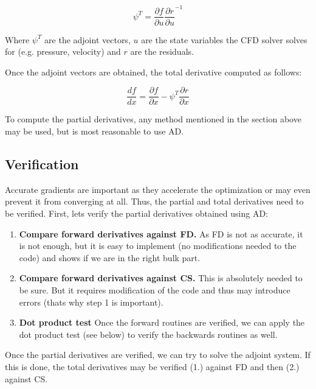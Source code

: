 \begin{equation}
    \psi^T = \frac{\partial f}{\partial u} \frac{\partial r}{\partial u}^{-1}
\end{equation}

\noindent Where $\psi^T$ are the adjoint vectors, $u$ are the state variables
the CFD solver solves for (e.g. pressure, velocity) and $r$ are the residuals.

Once the adjoint vectors are obtained, the total derivative computed as
follows:

\begin{equation}
    \frac{df}{dx} = \frac{\partial f}{\partial x} - 
    \psi^T \frac{\partial r}{\partial x}
\end{equation}


\noindent To compute the partial derivatives, any method mentioned in the
section above may be used, but is most reasonable to use AD. \cite{mdobook}




\subsection{Verification}
Accurate gradients are important as they accelerate the optimization or may
even prevent it from converging at all. Thus, the partial and total derivatives
need to be verified. First, lets verify the partial derivatives obtained using
AD:

\begin{enumerate}
    \item \textbf{Compare forward derivatives against FD.} As FD is not as
        accurate, it is not enough, but it is easy to implement (no
        modifications needed to the code) and shows if we are in the right bulk
        part.
    \item \textbf{Compare forward derivatives against CS.} This is absolutely
        needed to be sure. But it requires modification of the code and thus
        may introduce errors (thats why step 1 is important).

    \item \textbf{Dot product test} Once the forward routines are verified, we
        can apply the dot product test (see below) to verify the backwards
        routines as well.
\end{enumerate}

\noindent Once the partial derivatives are verified, we can try to solve the
adjoint system. If this is done, the total derivatives may be verified (1.)
against FD and then (2.) against CS.

